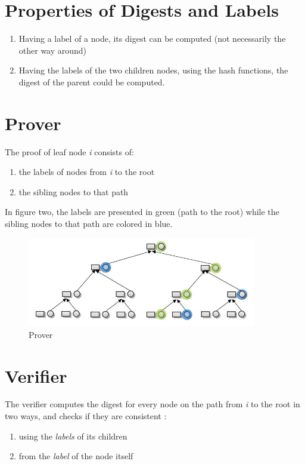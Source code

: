 \documentclass[11pt, letterpaper, oneside]{article}
\begin{document}
\section{Properties of Digests and Labels}
	
	\begin{enumerate}
		\item Having a label of a node, its digest can be computed (not necessarily the other way around)
		\item Having the labels of the two children nodes, using the hash functions, the digest of the parent could be computed.
	\end{enumerate}
	
	\section{Prover}
	
	The proof of leaf node \textit{i} consists of: 
	\begin{enumerate}
		\item the labels of nodes from \textit{i} to the root
		\item the sibling nodes to that path
	\end{enumerate}
	
	In figure two, the labels are presented in green (path to the root) while the sibling nodes to that path are colored in blue. 

	\begin{figure}[h]
        \centering
        \includegraphics[width=100mm]{./images/8.jpg}
        \caption[]{Prover}
        \end{figure}
	
	
	\section{Verifier}
	
	The verifier computes the digest for every node on the path from \textit{i} to the root in two ways, and checks if they are consistent :
	
	\begin{enumerate}
	 \item using the \textit{labels} of its children
	 \item from the \textit{label} of the node itself
	\end{enumerate}
\end{document}

